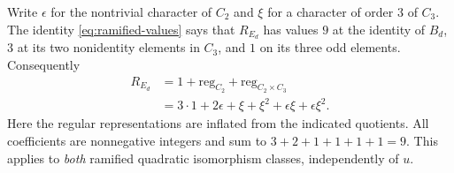 \documentclass[11pt]{article}
\theoremstyle{plain}
\theoremstyle{definition}
\begin{document}
Write $\epsilon$ for the nontrivial character of $C_2$
and $\xi$ for a character of order $3$ of $C_3$.
The identity \eqref{eq:ramified-values} says that $R_{E_d}$
has values $9$ at the identity of $B_d$, $3$ at its two
nonidentity elements in $C_3$, and $1$ on its three odd elements.
Consequently
\begin{equation}\label{eq:ram-fourier}
 \boxed{\quad
 \begin{aligned}
 R_{E_d}
 &=1+\mathrm{reg}_{C_2}+\mathrm{reg}_{C_2\times C_3}\\
 &=3\cdot1+2\epsilon
   +\xi+\xi^2+\epsilon\xi+\epsilon\xi^2.
 \end{aligned}\quad}
\end{equation}
Here the regular representations are inflated from the indicated
quotients.  All coefficients are nonnegative integers and sum
to $3+2+1+1+1+1=9$.  This applies to \emph{both} ramified
quadratic isomorphism classes, independently of $u$.
\end{document}
